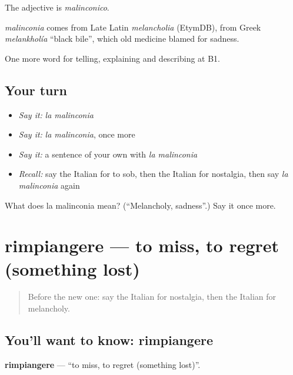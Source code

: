 The adjective is \emph{malinconico}.

\begin{cousinweb}
\emph{malinconia} comes from Late Latin \emph{melancholia} (EtymDB), from Greek \emph{melankholía} \textquotedblleft{}black bile\textquotedblright{}, which old medicine blamed for sadness.
\end{cousinweb}

\begin{grammarlens}[title={What you've built}]
One more word for telling, explaining and describing at B1.
\end{grammarlens}

\subsection*{Your turn}
\begin{itemize}
\raggedright
  \item \emph{Say it:} \emph{la malinconia}
  \item \emph{Say it:} \emph{la malinconia}, once more
  \item \emph{Say it:} a sentence of your own with \emph{la malinconia}
  \item \emph{Recall:} say the Italian for to sob, then the Italian for nostalgia, then say \emph{la malinconia} again
\end{itemize}

\begin{tcolorbox}[breakable,colback=teal!4,colframe=teal!35!black,title={Before you move on}]
What does la malinconia mean? (\textquotedblleft{}Melancholy, sadness\textquotedblright{}.) Say it once more.
\end{tcolorbox}
\section[rimpiangere]{rimpiangere — to miss, to regret (something lost)}

\label{lesson:IT-C477-rimpiangere}



\begin{quote}
Before the new one: say the Italian for nostalgia, then the Italian for melancholy.
\end{quote}

\subsection*{You'll want to know: rimpiangere}
\textbf{rimpiangere} — \textquotedblleft{}to miss, to regret (something lost)\textquotedblright{}.

